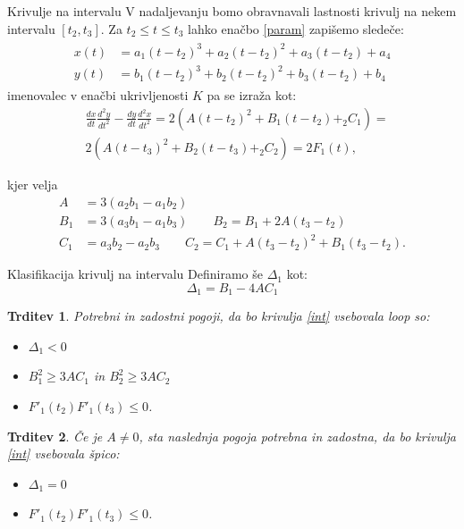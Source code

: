 \documentclass{beamer} %
\newtheorem{trditev}{Trditev}
\begin{document}
\begin{frame}{Krivulje na intervalu}
	V nadaljevanju bomo obravnavali lastnosti krivulj na nekem intervalu $[t_2,t_3]$. Za $t_2 \leq t \leq t_3$ lahko enačbo \eqref{param} zapišemo sledeče:
	\begin{align}
	\begin{split}
		x(t) &= a_1(t-t_2)^3+a_2(t-t_2)^2+a_3(t-t_2)+a_4 \\
		y(t) &= b_1(t-t_2)^3+b_2(t-t_2)^2+b_3(t-t_2)+b_4 
		\label{int}
	\end{split}
	\end{align}
	imenovalec v enačbi ukrivljenosti $K$ pa se izraža kot:
	 \begin{align*}
	 &\frac{dx}{dt}\frac{d^2y}{dt^2} - \frac{dy}{dt}\frac{d^2x}{dt^2} = 2(A(t-t_2)^2 + B_1(t-t_2) +_2C_1) = \\
	 &2(A(t-t_3)^2 + B_2(t-t_3) +_2C_2) = 
	 2F_1(t) \text{,}
	 \end{align*}
	 
	 kjer velja
	 	\begin{align*}
	 A &= 3(a_2b_1-a_1b_2)\\
	 B_1 &= 3(a_3b_1 -a_1b_3)  \qquad B_2 = B_1 +2A(t_3-t_2) \\
	 C_1 &= a_3b_2-a_2b_3  \qquad C_2 = C_1 +A(t_3-t_2)^2+B_1(t_3-t_2) \text{.}
	 \end{align*}
	
 \end{frame}

\begin{frame}{Klasifikacija krivulj na intervalu}
	Definiramo še $\Delta_1$ kot:
	\[  \Delta_1= B_1 - 4AC_1 \]
	\begin{trditev}
		Potrebni in zadostni pogoji, da bo krivulja \eqref{int} vsebovala loop so:
		\begin{itemize}
			\item  $\Delta_1 <0$
			\item $B^2_1 \geq 3AC_1$ in $B^2_2 \geq 3AC_2$
			\item $F'_1(t_2) F'_1(t_3) \leq 0$.
		\end{itemize}
	\end{trditev}
	\begin{trditev}
	Če je $A \neq 0$, sta naslednja pogoja potrebna in zadostna, da bo krivulja \eqref{int} vsebovala špico:
	\begin{itemize}
		\item  $\Delta_1 =0$
		\item $F'_1(t_2) F'_1(t_3) \leq 0$.
	\end{itemize}
\end{trditev}
\end{frame}
\end{document}
